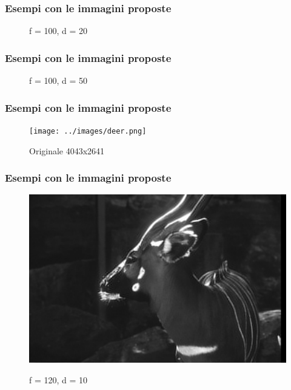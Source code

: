 \documentclass{beamer}
\begin{document}
\begin{frame}
	\frametitle{Esempi con le immagini proposte}
	\begin{figure}
		\caption{f = 100, d = 20}
	\end{figure}
\end{frame}

\begin{frame}
	\frametitle{Esempi con le immagini proposte}
	\begin{figure}
		\caption{f = 100, d = 50}
	\end{figure}
\end{frame}

\begin{frame}
	\frametitle{Esempi con le immagini proposte}
	\begin{figure}
		{\texttt{[image: ../images/deer.png]}}
		\caption{Originale 4043x2641}
	\end{figure}
\end{frame}

\begin{frame}
	\frametitle{Esempi con le immagini proposte}
	\begin{figure}
		{\includegraphics[width=.8\linewidth]{../images/deer-compressed-120-10.png}}
		\caption{f = 120, d = 10}
	\end{figure}
\end{frame}
\end{document}
